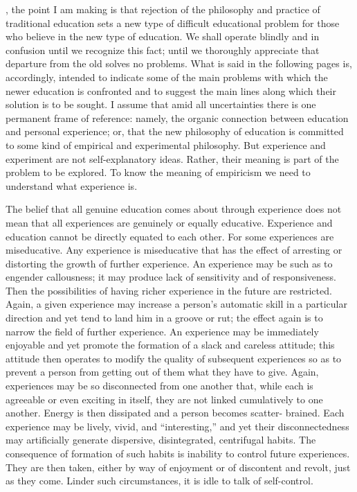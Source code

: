 , the point I am making is that rejection of the philosophy and practice of 
traditional education sets a new type of difficult educational problem for those who 
believe in the new type of education. We shall operate blindly and in confusion until we 
recognize this fact; until we thoroughly appreciate that departure from the old solves no 
problems. What is said in the following pages is, accordingly, intended to indicate some 
of the main problems with which the newer education is confronted and to suggest the 
main lines along which their solution is to be sought. I assume that amid all uncertainties 
there is one permanent frame of reference: namely, the organic connection between 
education and personal experience; or, that the new philosophy of education is committed 
to some kind of empirical and experimental philosophy. But experience and experiment 
are not self-explanatory ideas. Rather, their meaning is part of the problem to be 
explored. To know the meaning of empiricism we need to understand what experience is. 

The belief that all genuine education comes about through experience does not mean 
that all experiences are genuinely or equally educative. Experience and education cannot 
be directly equated to each other. For some experiences are miseducative. Any 
experience is miseducative that has the effect of arresting or distorting the growth of 
further experience. An experience may be such as to engender callousness; it may 
produce lack of sensitivity and of responsiveness. Then the possibilities of having richer 
experience in the future are restricted. Again, a given experience may increase a person's 
automatic skill in a particular direction and yet tend to land him in a groove or rut; the 
effect again is to narrow the field of further experience. An experience may be 
immediately enjoyable and yet promote the formation of a slack and careless attitude; this 
attitude then operates to modify the quality of subsequent experiences so as to prevent a 
person from getting out of them what they have to give. Again, experiences may be so 
disconnected from one another that, while each is agreeable or even exciting in itself, they are not linked cumulatively to one another. Energy is then dissipated and a person 
becomes scatter- brained. Each experience may be lively, vivid, and \enquote{interesting,} and yet 
their disconnectedness may artificially generate dispersive, disintegrated, centrifugal 
habits. The consequence of formation of such habits is inability to control future 
experiences. They are then taken, either by way of enjoyment or of discontent and revolt, 
just as they come. Linder such circumstances, it is idle to talk of self-control. 

